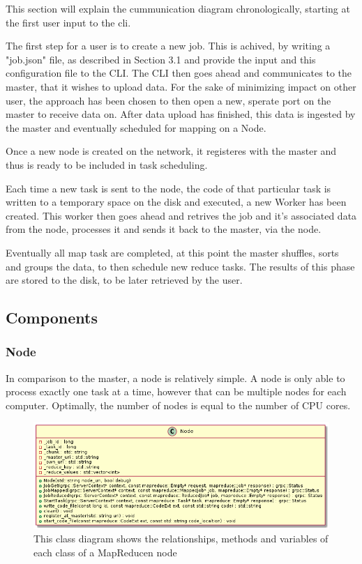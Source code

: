 \documentclass[a4paper]{article}
\begin{document}
This section will explain the cummunication diagram chronologically, starting at the first user input to the cli.

The first step for a user is to create a new job. This is achived, by writing a "job.json" file, as described in Section 3.1 and provide the input and this configuration file to the CLI. The CLI then goes ahead and communicates to the master, that it wishes to upload data. For the sake of minimizing impact on other user, the approach has been chosen to then open a new, sperate port on the master to receive data on. After data upload has finished, this data is ingested by the master and eventually scheduled for mapping on a Node.

Once a new node is created on the network, it registeres with the master and thus is ready to be included in task scheduling.

Each time a new task is sent to the node, the code of that particular task is written to a temporary space on the disk and executed, a new Worker has been created. This worker then goes ahead and retrives the job and it's associated data from the node, processes it and sends it back to the master, via the node.

Eventually all map task are completed, at this point the master shuffles, sorts and groups the data, to then schedule new reduce tasks. The results of this phase are stored to the disk, to be later retrieved by the user.

\hypertarget{components}{%
\subsection{Components}\label{components}}

\hypertarget{node}{%
\subsubsection{Node}\label{node}}

In comparison to the master, a node is relatively simple. A node is only able to process exactly one task at a time, however that can be multiple nodes for each computer. Optimally, the number of nodes is equal to the number of CPU cores. 

\begin{figure}
\centering
\includegraphics[width=\linewidth]{images/class_diagram_node}
\caption{This class diagram shows the relationships, methods and variables of each class of a MapReducen node}
\end{figure}
\end{document}
